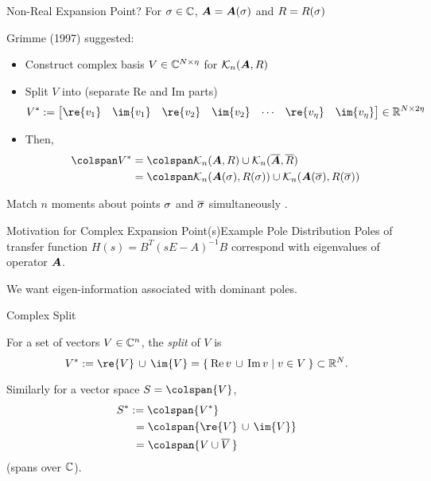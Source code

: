 \documentclass[serif]{beamer}
\begin{document}
\begin{frame}{Non-Real Expansion Point?}
For $\sigma\in\mathbb{C}$, $\bm{A}=\bm{A}(\sigma)$ and $R=R(\sigma)$ 

\medskip
Grimme (1997) suggested:
\begin{itemize}
\item Construct complex basis $V\in\mathbb{C}^{N\times\eta}$ for
$\mathcal{K}_{n}({\bm{A}},{R})$
\item Split $V$ into (separate $\text{Re}$ and $\text{Im}$ parts)
\[
  V^* := \mat{\re{v_1} & \im{v_1} & \re{v_2} & \im{v_2} & \cdots & \re{v_\nblock} & \im{v_\nblock}} 
  \in \R^{N \times 2\nblock}
 \]
\item Then, 
\begin{align*}
\colspan V^* &= \colspan \krylov{n}{\A}{R} \cup \krylov{n}{\conj{\A}}{\conj{R}}\\
&= \colspan \krylov{n}{\A(\xp)}{R(\xp)} \cup \krylov{n}{\A(\conj{\xp})}{R(\conj{\xp})}
\end{align*}
\end{itemize}
Match $n$ moments about points $\sigma$ and $\overline{\sigma}$ 
simultaneously .
\end{frame}



\begin{frame}{Motivation for Complex Expansion Point(s)}{Example Pole Distribution}
Poles of transfer function $H(s) =  B^T(sE-A)^{-1}B $
correspond with eigenvalues of operator $\bm{A}$.
 \begin{figure}
  	    \centering
  \end{figure}
  We want eigen-information associated with dominant poles. 
\end{frame}




\begin{frame}{Complex Split}

 For a set of vectors $V\in\mathbb{C}^n$, the \emph{split} of $V$ is  
 \[
 V^* :=  \re{V} \,\cup\, \im{V} = \Set{ \text{Re}\, v \,\cup\, \text{Im}\, v | v\in V}\subset\R^N.
\]

 Similarly for a vector space $S = \colspan{V}$, 
 \begin{align*}
 	S^* &:= \colspan{V^*} \\
 	&\ = \colspan{\re{V} \,\cup\, \im{V}} \\
 	&\ = \colspan{V \cup \conj{V}\,}
\end{align*}
(spans over $\mathbb{C}$). 
\end{frame}
\end{document}
